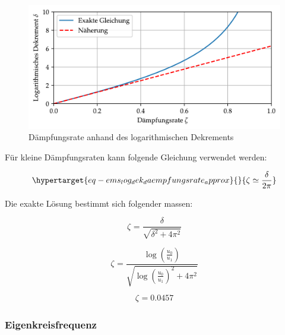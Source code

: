 \documentclass[
  letterpaper,
  DIV=11]{scrreprt}
\begin{document}
\begin{figure}[H]

{\centering \includegraphics{index_files/mediabag/ems_01_files/figure-pdf/fig-ems_log_dek_daempfungsrate-output-1.pdf}

}

\caption{\label{fig-ems_log_dek_daempfungsrate}Dämpfungsrate anhand des
logarithmischen Dekrements}

\end{figure}

Für kleine Dämpfungsraten kann folgende Gleichung verwendet werden:

\begin{equation}\protect\hypertarget{eq-ems_log_dek_daempfungsrate_approx}{}{
\zeta \simeq \frac{\delta}{2\pi}
}\label{eq-ems_log_dek_daempfungsrate_approx}\end{equation}

Die exakte Lösung bestimmt sich folgender massen:

\begin{equation}\zeta_{} = \frac{\delta}{\sqrt{\delta^{2} + 4 \pi^{2}}}\end{equation}

\begin{equation}\zeta_{} = \frac{\log{\left(\frac{u_{0}}{u_{1}} \right)}}{\sqrt{\log{\left(\frac{u_{0}}{u_{1}} \right)}^{2} + 4 \pi^{2}}}\end{equation}

\begin{equation}\zeta_{} = 0.0457\end{equation}

\hypertarget{eigenkreisfrequenz}{%
\subsubsection{Eigenkreisfrequenz}\label{eigenkreisfrequenz}}
\end{document}
